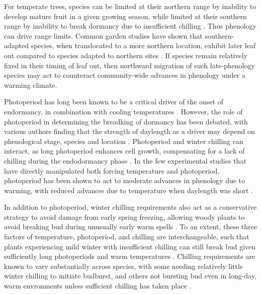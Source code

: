\documentclass[11pt]{article}
\begin{document}
For temperate trees, species can be limited at their northern range by inability to develop mature fruit in a given growing season, while limited at their southern range by inability to break dormancy due to insufficient chilling \cite{Chuine:2010}. Thus phenology can drive range limits. Common garden studies have shown that southern-adapted species, when translocated to a more northern location, exhibit later leaf out compared to species adapted to northern sites \cite{Zohner:2014aa}. If species remain relatively fixed in their timing of leaf out, then northward migration of such late-phenology species may act to counteract community-wide advances in phenology under a warming climate. 

Photoperiod has long been known to be a critical driver of the onset of endormancy, in combination with cooling temperatures \cite{Foley:2009aa}. However, the role of photoperiod in determining the breadking of dormancy has been debated, with various authors finding that the strength of daylength as a driver may depend on phenological stage, species and location \cite{Heide:1993}\cite{Falusi:1996aa}. Photoperiod and winter chilling can interact, as long photoperiod enhances cell growth, compensating for a lack of chilling during the endodormancy phase \cite{Heide:1993b}\cite{Caffarra:2011aa}\cite{Myking:1995}. In the few experimental studies that have directly manipulated both forcing temperature and photoperiod, photoperiod has been shown to act to moderate advances in phenology due to warming, with reduced advances due to temperature when daylength was short \cite{Sanz-Perez:2009aa}\cite{Heide:1993b}. 


In addition to photoperiod, winter chilling requirements also act as a conservative strategy to avoid damage from early spring freezing, allowing woody plants to avoid breaking bud during unusually early warm spells \cite{Ghelardini:2010aa}. To an extent, these three factors of temperature, photoperiod, and chilling are interchangeable, such that plants experiencing mild winter with insufficient chilling can still break bud given sufficiently long photoperiods and warm temperatures \cite{Heide:1993b}. Chilling requirements are known to vary substantially across species, with some needing relatively little winter chilling to initiate budburst, and others not bursting bud even in long-day, warm envronments unless sufficient chilling has taken place \cite{Korner:2010}. 
\end{document}
